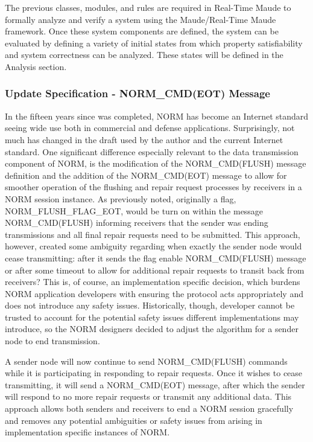 \documentclass[10pt, journal]{IEEEtran}
\begin{document}
The previous classes, modules, and rules are required in Real-Time Maude to formally analyze and verify a system using the Maude/Real-Time Maude framework. Once these system components are defined, the system can be evaluated by defining a variety of initial states from which property satisfiability and system correctness can be analyzed. These states will be defined in the Analysis section.

\subsubsection{Update Specification - NORM\_CMD(EOT) Message}
In the fifteen years since \cite{Lien2004} was completed, NORM has become an Internet standard seeing wide use both in commercial and defense applications. Surprisingly, not much has changed in the draft used by the author and the current Internet standard. One significant difference especially relevant to the data transmission component of NORM, is the modification of the NORM\_CMD(FLUSH) message definition and the addition of the NORM\_CMD(EOT) message to allow for smoother operation of the flushing and repair request processes by receivers in a NORM session instance. As previously noted, originally a flag, NORM\_FLUSH\_FLAG\_EOT, would be turn on within the message NORM\_CMD(FLUSH) informing receivers that the sender was ending transmissions and all final repair requests need to be submitted. This approach, however, created some ambiguity regarding when exactly the sender node would cease transmitting: after it sends the flag enable NORM\_CMD(FLUSH) message or after some timeout to allow for additional repair requests to transit back from receivers? This is, of course, an implementation specific decision, which burdens NORM application developers with ensuring the protocol acts appropriately and does not introduce any safety issues. Historically, though, developer cannot be trusted to account for the potential safety issues different implementations may introduce, so the NORM designers decided to adjust the algorithm for a sender node to end transmission.

A sender node will now continue to send NORM\_CMD(FLUSH) commands while it is participating in responding to repair requests. Once it wishes to cease transmitting, it will send a NORM\_CMD(EOT) message, after which the sender will respond to no more repair requests or transmit any additional data. This approach allows both senders and receivers to end a NORM session gracefully and removes any potential ambiguities or safety issues from arising in implementation specific instances of NORM.
\end{document}
